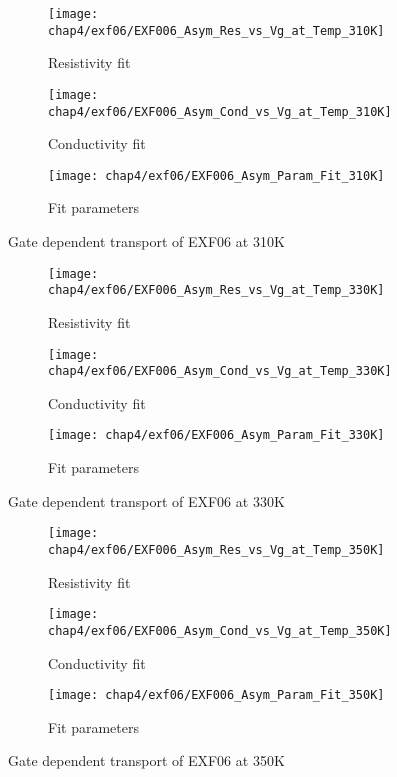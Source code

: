 \documentclass[../Matt_Gebert_Honours_Thesis.tex]{subfiles}
\begin{document}
	\begin{figure}[H]
		\centering
		\begin{subfigure}{0.4\textwidth}
			\centering
			\texttt{[image: chap4/exf06/EXF006\_Asym\_Res\_vs\_Vg\_at\_Temp\_310K]}
			\caption{Resistivity fit}
		\end{subfigure}
		\begin{subfigure}{0.4\textwidth}
			\centering
			\texttt{[image: chap4/exf06/EXF006\_Asym\_Cond\_vs\_Vg\_at\_Temp\_310K]}
			\caption{Conductivity fit}
		\end{subfigure}
		\begin{subfigure}{0.16\textwidth}
			\centering
			\texttt{[image: chap4/exf06/EXF006\_Asym\_Param\_Fit\_310K]}
			\caption{Fit parameters}
		\end{subfigure}
		\caption*{Gate dependent transport of EXF06 at 310K}
	\end{figure}
	\begin{figure}[H]
		\centering
		\begin{subfigure}{0.4\textwidth}
			\centering
			\texttt{[image: chap4/exf06/EXF006\_Asym\_Res\_vs\_Vg\_at\_Temp\_330K]}
			\caption{Resistivity fit}
		\end{subfigure}
		\begin{subfigure}{0.4\textwidth}
			\centering
			\texttt{[image: chap4/exf06/EXF006\_Asym\_Cond\_vs\_Vg\_at\_Temp\_330K]}
			\caption{Conductivity fit}
		\end{subfigure}
		\begin{subfigure}{0.16\textwidth}
			\centering
			\texttt{[image: chap4/exf06/EXF006\_Asym\_Param\_Fit\_330K]}
			\caption{Fit parameters}
		\end{subfigure}
		\caption*{Gate dependent transport of EXF06 at 330K}
	\end{figure}
	\begin{figure}[H]
		\centering
		\begin{subfigure}{0.4\textwidth}
			\centering
			\texttt{[image: chap4/exf06/EXF006\_Asym\_Res\_vs\_Vg\_at\_Temp\_350K]}
			\caption{Resistivity fit}
		\end{subfigure}
		\begin{subfigure}{0.4\textwidth}
			\centering
			\texttt{[image: chap4/exf06/EXF006\_Asym\_Cond\_vs\_Vg\_at\_Temp\_350K]}
			\caption{Conductivity fit}
		\end{subfigure}
		\begin{subfigure}{0.16\textwidth}
			\centering
			\texttt{[image: chap4/exf06/EXF006\_Asym\_Param\_Fit\_350K]}
			\caption{Fit parameters}
		\end{subfigure}
		\caption*{Gate dependent transport of EXF06 at 350K}
	\end{figure}
\end{document}
